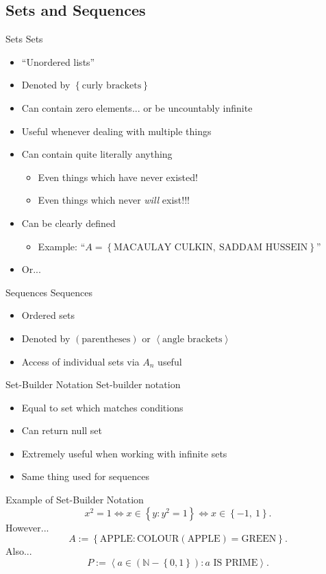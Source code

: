 \documentclass{beamer}
\begin{document}
		\subsection{Sets and Sequences}
			\begin{frame}{Sets}
				Sets
				\begin{itemize}
					\item ``Unordered lists''
					\item Denoted by $\left\{\textrm{curly brackets}\right\}$
					\item Can contain zero elements... or be uncountably infinite
					\item Useful whenever dealing with multiple things
					\item Can contain quite literally anything
					\begin{itemize}
						\item Even things which have never existed!
						\item Even things which never \textit{will} exist!!!
					\end{itemize}
					\item Can be clearly defined
					\begin{itemize}
						\item Example: ``$A = \left\{\textrm{MACAULAY CULKIN},\ 
							\textrm{SADDAM HUSSEIN}\right\}$''
					\end{itemize}
					\item Or...
				\end{itemize}
			\end{frame}
			\begin{frame}{Sequences}
				Sequences
				\begin{itemize}
					\item Ordered sets
					\item Denoted by $\left(\textrm{parentheses}\right)$ or
						$\left\langle\textrm{angle brackets}\right\rangle$
					\item Access of individual sets via $A_n$ useful
				\end{itemize}
			\end{frame}
			\begin{frame}{Set-Builder Notation}
				Set-builder notation
				\begin{itemize}
					\item Equal to set which matches conditions
					\item Can return null set
					\item Extremely useful when working with infinite sets
					\item Same thing used for sequences
				\end{itemize}
			\end{frame}
			\begin{frame}{Example of Set-Builder Notation}
				\[
					x^2 = 1 \iff
					x \in \left\{y : y^2 = 1\right\} \iff
					x \in \left\{-1,\ 1\right\}.
				\]
				However...
				\[
					A :=
					\left\{
						\textrm{APPLE} :
						\textrm{COLOUR}\left(\textrm{APPLE}\right) =
						\textrm{GREEN}
					\right\}.
				\]
				Also...
				\[
					P :=
					\left\langle
						a \in \left(\mathbb{N} - \left\{0,1\right\}\right) :
						a \textrm{ IS PRIME}
					\right\rangle.
				\]
			\end{frame}
\end{document}

